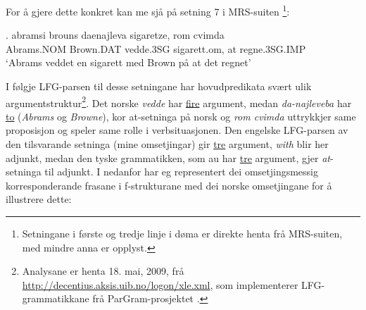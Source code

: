 \documentclass[11pt,a4paper,oneside,draft]{book}
\begin{document}
For å gjere dette konkret kan me sjå på setning 7 i MRS-suiten
\citep{mrs-suite}\footnote{Setningane i første og tredje linje i døma er direkte henta frå
MRS-suiten, med mindre anna er opplyst. }:

\exg.  abramsi brouns       daenajleva sigaretze, rom cvimda \\
      Abrams.NOM Brown.DAT vedde.3SG sigarett.om, at  regne.3SG.IMP \\
     `Abrams veddet en sigarett med Brown på at det regnet' 

I følgje LFG-parsen til desse setningane har hovudpredikata svært ulik
argumentstruktur\footnote{Analysane er henta 18. mai, 2009, frå
        \href{http://decentius.aksis.uib.no/logon/xle.xml}{http://decentius.aksis.uib.no/logon/xle.xml}, som implementerer
        LFG-grammatikkane frå ParGram-prosjektet \citep{butt2002pgp}. }. Det norske \emph{vedde} har \underline{fire} argument, medan
\emph{da-najleveba} har \underline{to} (\emph{Abrams} og \emph{Browne}), kor at-setninga på
norsk og \emph{rom cvimda} uttrykkjer same proposisjon og speler same rolle
i verbsituasjonen. Den engelske LFG-parsen av den tilsvarande setninga
(mine omsetjingar) gir \underline{tre} argument, \emph{with} blir her adjunkt, medan
den tyske grammatikken, som au har \underline{tre} argument, gjer \emph{at}-setninga
til adjunkt. I \Next nedanfor har eg representert dei omsetjingsmessig
korresponderande frasane i f-strukturane med dei norske omsetjingane
for å illustrere dette:
\end{document}
